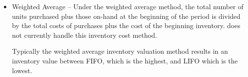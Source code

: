 \begin{itemize}
        \item Weighted Average -- Under the weighted average method, the total number of units 
        purchased plus those on-hand at the beginning of the period is divided by the total costs
        of purchases plus the cost of the beginning inventory. \lsmbsp does not currently handle this 
        inventory cost method.
        
        Typically the weighted average inventory valuation method results in 
        an inventory value between \gls{FIFO}, which is the highest,
        and \gls{LIFO} which is the lowest.
\end{itemize}

 
